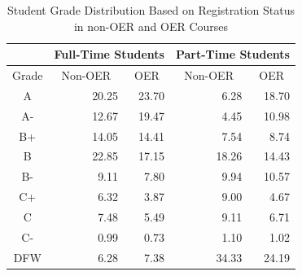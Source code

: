 \documentclass[11pt]{article}
\begin{document}
\begin{table}
\centering
\begin{tabular}{crrrr}
  & \multicolumn{2}{c}{Full-Time Students} & \multicolumn{2}{c}{Part-Time Students} \\ \hline
  \multicolumn{1}{c}{Grade} & \multicolumn{1}{c}{Non-OER} & \multicolumn{1}{c}{OER} & \multicolumn{1}{c}{Non-OER} & \multicolumn{1}{c}{OER}\\ \hline
  A\hspace{1.1ex} & 20.25 & 23.70 & 6.28 & 18.70 \\
  A-\hspace{0.7ex} & 12.67 & 19.47 & 4.45 & 10.98 \\
  B+ & 14.05 & 14.41 & 7.54 & 8.74 \\
  B\hspace{1.1ex} & 22.85 & 17.15 & 18.26 & 14.43 \\
  B-\hspace{0.7ex} & 9.11 & 7.80 & 9.94 & 10.57 \\
  C+ & 6.32 & 3.87 & 9.00 & 4.67 \\
  C\hspace{1.1ex} & 7.48 & 5.49 & 9.11 & 6.71 \\
  C-\hspace{0.8ex} & 0.99 & 0.73 & 1.10 & 1.02 \\
  DFW & 6.28 & 7.38 & 34.33 & 24.19 \\ \hline
\end{tabular}
\caption{Student Grade Distribution Based on Registration Status in non-OER and OER Courses \cite{CB-WC-PH:18}}
\end{table}
\end{document}
